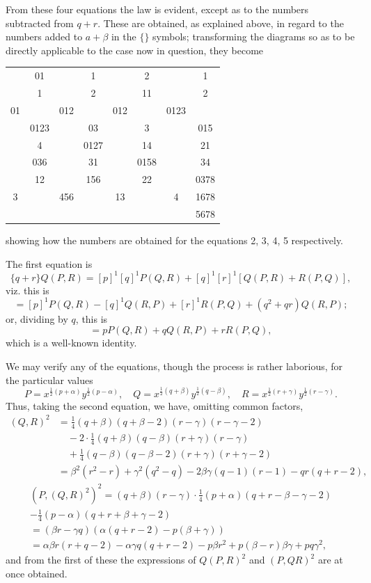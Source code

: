 \documentclass[11pt,a4paper]{book}
\begin{document}
From these four equations the law is evident, except as to the numbers subtracted from $q + r$. These are obtained, as explained above, in regard to the numbers added to $a + \beta$ in the $\{\}$ symbols; transforming the diagrams so as to be directly applicable to the case now in question, they become
\begin{center}
\begin{tabular}{cccccccc}
 & 01 & & 1 & & 2 & & 1 \\
 & 1 & & 2 & & 11 & & 2 \\
01 & & 012 & & 012 & & 0123 & \\
 & 0123 & & 03 & & 3 & & 015 \\
 & 4 & & 0127 & & 14 & & 21 \\
 & 036 & & 31 & & 0158 & & 34 \\
 & 12 & & 156 & & 22 & & 0378 \\
3 & & 456 & & 13 & & 4 & 1678 \\
 & & & & & & & 5678
\end{tabular}
\end{center}
showing how the numbers are obtained for the equations 2, 3, 4, 5 respectively.

The first equation is
\[
\{q + r\} Q(P, R) = [p]^1 [q]^1 P(Q, R) + [q]^1 [r]^1 [Q(P, R) + R(P, Q)],
\]
viz. this is
\[
= [p]^1 P(Q, R) - [q]^1 Q(R, P) + [r]^1 R(P, Q) + (q^2 + qr) Q(R, P);
\]
or, dividing by $q$, this is
\[
= p P(Q, R) + q Q(R, P) + r R(P, Q),
\]
which is a well-known identity.

We may verify any of the equations, though the process is rather laborious, for the particular values
\[
P = x^{\frac{1}{2}(p+\alpha)} y^{\frac{1}{2}(p-\alpha)}, \quad Q = x^{\frac{1}{2}(q+\beta)} y^{\frac{1}{2}(q-\beta)}, \quad R = x^{\frac{1}{2}(r+\gamma)} y^{\frac{1}{2}(r-\gamma)}.
\]
Thus, taking the second equation, we have, omitting common factors,
\begin{align*}
(Q, R)^2 &= \tfrac{1}{4}(q + \beta)(q + \beta - 2)(r - \gamma)(r - \gamma - 2) \\
&\quad - 2 \cdot \tfrac{1}{4}(q + \beta)(q - \beta)(r + \gamma)(r - \gamma) \\
&\quad + \tfrac{1}{4}(q - \beta)(q - \beta - 2)(r + \gamma)(r + \gamma - 2) \\
&= \beta^2(r^2 - r) + \gamma^2(q^2 - q) - 2\beta\gamma(q - 1)(r - 1) - qr(q + r - 2),
\end{align*}
\begin{multline*}
(P, (Q, R)^2)^2 = (q + \beta)(r - \gamma) \cdot \tfrac{1}{4}(p + \alpha)(q + r - \beta - \gamma - 2) \\
- \tfrac{1}{4}(p - \alpha)(q + r + \beta + \gamma - 2) \\
= (\beta r - \gamma q)(\alpha(q + r - 2) - p(\beta + \gamma)) \\
= \alpha\beta r(r + q - 2) - \alpha\gamma q(q + r - 2) - p\beta r^2 + p(\beta - r)\beta\gamma + pq\gamma^2,
\end{multline*}
and from the first of these the expressions of $Q(P, R)^2$ and $(P, QR)^2$ are at once obtained.
\end{document}
